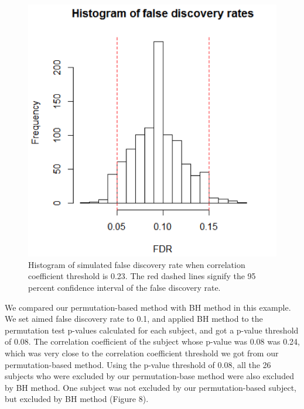 \documentclass[11pt,notitlepage]{article}
\begin{document}
\begin{figure}[h c] %
\centering
\includegraphics[scale = .90]{Figures/Part3_2.png}
\caption{\footnotesize Histogram of simulated false discovery rate when correlation coefficient threshold is 0.23. The red dashed lines signify the 95 percent confidence interval of the false discovery rate.}
\end{figure}



We compared our permutation-based method with BH method in this example. We set aimed false discovery rate to 0.1, and applied BH method to the permutation test p-values calculated for each subject, and got a p-value threshold of 0.08. The correlation coefficient of the subject whose p-value was 0.08 was 0.24, which was very close to the correlation coefficient threshold we got from our permutation-based method. Using the p-value threshold of 0.08, all the 26 subjects who were excluded by our permutation-base method were also excluded by BH method. One subject was not excluded by our permutation-based subject, but excluded by BH method (Figure 8).
\end{document}
